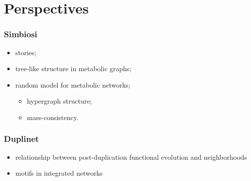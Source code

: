\documentclass{beamer}
\begin{document}
\section{Perspectives}

\begin{frame}
\frametitle{Simbiosi}

 \begin{itemize}
 \item stories;
 \item tree-like structure in metabolic graphs;
 \item random model for metabolic networks;
  \begin{itemize}
   \item hypergraph structure;
   \item mass-consistency.
  \end{itemize}
 \end{itemize}
 

\begin{figure} [htb] 
\begin{center}
\end{center}
\end{figure}
\end{frame}

\begin{frame}
\frametitle{Duplinet}

 \begin{itemize}
 \item relationship between post-duplication functional evolution and neighborhoods

\begin{figure} [htb] 
\begin{center}
\end{center}
\end{figure}

 \item motifs in integrated networks 

\begin{figure} [htb] 
\begin{center}
\end{center}
\end{figure}



 \end{itemize}


\end{frame}
\end{document}
